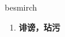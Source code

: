 
\begin{frame}
{\huge besmirch}
\begin{center}
\begin{enumerate}\Large
  \item \textbf{诽谤，玷污}
\end{enumerate}
\end{center}
\end{frame}

